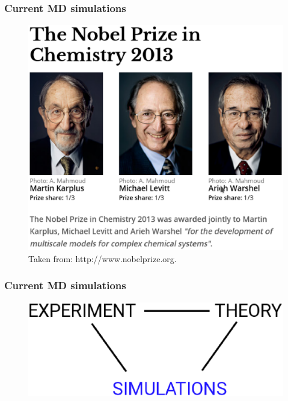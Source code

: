 \documentclass{beamer}
\begin{document}
\begin{frame}\frametitle{Current MD simulations}

\begin{figure}
\includegraphics[scale=0.33]{nobel_prize.eps}
\caption{{\scriptsize Taken from: http://www.nobelprize.org.}}
\end{figure}

\end{frame}



\begin{frame}\frametitle{Current MD simulations}

\begin{figure}
\includegraphics[scale=0.39]{three_approaches.eps}
\end{figure}

\end{frame}
\end{document}
